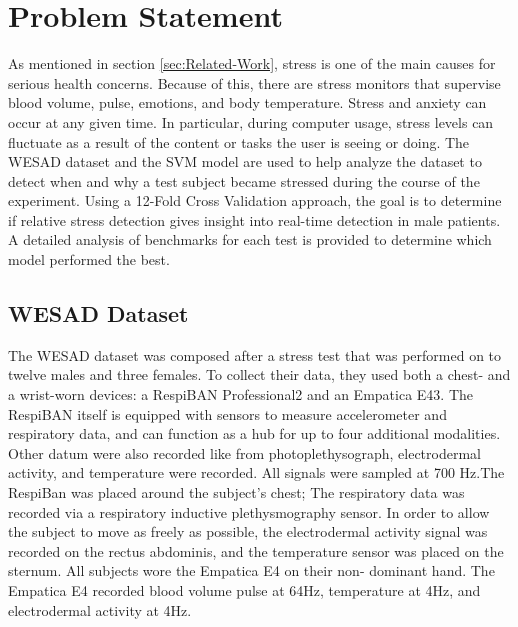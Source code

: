 \section{Problem Statement}
\label{sec:Problem-Statement}

As mentioned in section \ref{sec:Related-Work}, stress is one of the main causes for serious health concerns.
Because of this, there are stress monitors that supervise blood volume, pulse, emotions, and 
body temperature. Stress and anxiety can occur at any given time. In particular, during computer usage, stress levels 
can fluctuate as a result of the content or tasks the user is seeing or doing. The WESAD dataset and the SVM model are used to help analyze the dataset 
to detect when and why a test subject became stressed during the course of the experiment. 
Using a 12-Fold Cross Validation approach, the goal is to determine if relative stress detection gives insight into real-time detection in male patients.
A detailed analysis of benchmarks for each test is provided to determine which model performed the best.

\subsection{WESAD Dataset}
\label{sec:Dataset}

The WESAD dataset was composed after a stress test that was performed on to twelve males and three females. 
To collect their data, they used both a chest- and a wrist-worn devices: a RespiBAN Professional2 and an Empatica E43. 
The RespiBAN itself is equipped with sensors to measure accelerometer and respiratory data, and can function as a hub for up to four additional modalities. 
Other datum were also recorded like from photoplethysograph, electrodermal activity, and temperature were recorded. 
All signals were sampled at 700 Hz.The RespiBan was placed around the subject’s chest; The respiratory data was recorded via 
a respiratory inductive plethysmography sensor. In order to allow the subject to move as freely as possible, the electrodermal 
activity signal was recorded on the rectus abdominis, and the temperature sensor was placed on the sternum. All subjects wore 
the Empatica E4 on their non- dominant hand. The Empatica E4 recorded blood volume pulse at 64Hz, temperature at 4Hz, and electrodermal activity at 4Hz.

